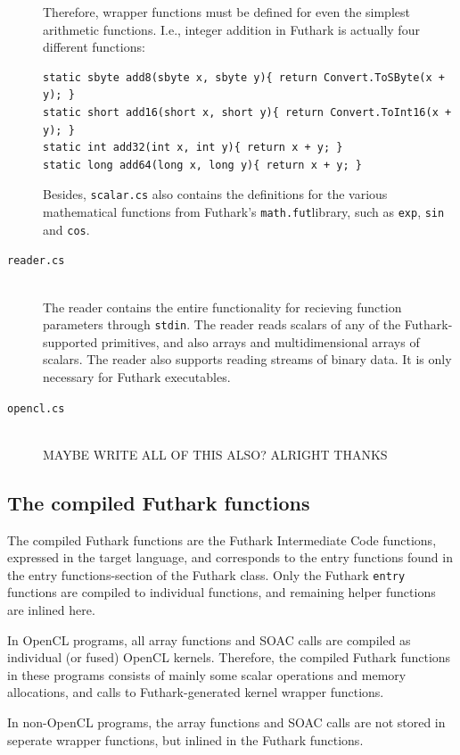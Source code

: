 \begin{description}
  Therefore, wrapper functions must be defined for even the simplest arithmetic
  functions. I.e., integer addition in \csharp{} Futhark is actually four different
  functions:
\begin{verbatim}
static sbyte add8(sbyte x, sbyte y){ return Convert.ToSByte(x + y); }
static short add16(short x, short y){ return Convert.ToInt16(x + y); }
static int add32(int x, int y){ return x + y; }
static long add64(long x, long y){ return x + y; }
\end{verbatim}

  Besides, \texttt{scalar.cs} also contains the \csharp{} definitions for the various
  mathematical functions from Futhark's \texttt{math.fut}library, such as \texttt{exp},
  \texttt{sin} and \texttt{cos}.

\item[\texttt{reader.cs}] \hfill\\
  The reader contains the entire functionality for recieving function parameters
  through \texttt{stdin}. The reader reads scalars of any of the
  Futhark-supported primitives, and also arrays and multidimensional arrays of
  scalars.
  The reader also supports reading streams of binary data.
  It is only necessary for Futhark executables.
\item[\texttt{opencl.cs}] \hfill\\
  MAYBE WRITE ALL OF THIS ALSO? ALRIGHT THANKS
\end{description}

\subsection{The compiled Futhark functions}
  The compiled Futhark functions are the Futhark Intermediate Code functions,
  expressed in the target language, and corresponds to the entry functions found
  in the entry functions-section of the Futhark class.
  Only the Futhark \texttt{entry} functions are compiled to individual functions, and
  remaining helper functions are inlined here.

  In OpenCL programs, all array functions and SOAC calls are compiled as
  individual (or fused) OpenCL kernels. Therefore, the compiled Futhark
  functions in these programs consists of mainly some scalar operations and
  memory allocations, and calls to Futhark-generated kernel wrapper functions.
  
  In non-OpenCL programs, the array functions and SOAC calls are not stored in
  seperate wrapper functions, but inlined in the Futhark functions.

